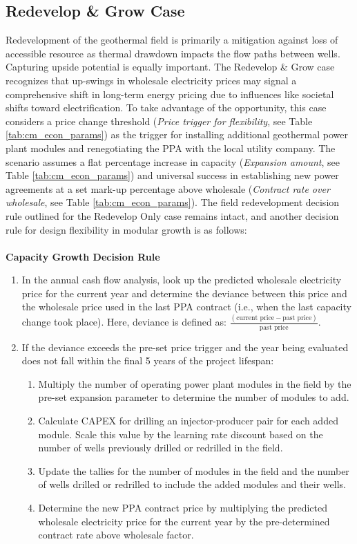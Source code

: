 \subsection{Redevelop \& Grow Case}\label{ch4:flex_grow_case}
Redevelopment of the geothermal field is primarily a mitigation against loss of accessible resource as thermal drawdown impacts the flow paths between wells. Capturing upside potential is equally important. The Redevelop \& Grow case recognizes that up-swings in wholesale electricity prices may signal a comprehensive shift in long-term energy pricing due to influences like societal shifts toward electrification. To take advantage of the opportunity, this case considers a price change threshold (\textit{Price trigger for flexibility}, see Table \ref{tab:cm_econ_params}) as the trigger for installing additional geothermal power plant modules and renegotiating the PPA with the local utility company. The scenario assumes a flat percentage increase in capacity (\textit{Expansion amount}, see Table \ref{tab:cm_econ_params}) and universal success in establishing new power agreements at a set mark-up percentage above wholesale (\textit{Contract rate over wholesale}, see Table \ref{tab:cm_econ_params}). The field redevelopment decision rule outlined for the Redevelop Only case remains intact, and another decision rule for design flexibility in modular growth is as follows:
\\
\\
\textbf{Capacity Growth Decision Rule}\label{ch4:dr_grow}
\begin{enumerate}
    \item In the annual cash flow analysis, look up the predicted wholesale electricity price for the current year and determine the deviance between this price and the wholesale price used in the last PPA contract (i.e., when the last capacity change took place). Here, deviance is defined as: \(\frac{(\text{current price} - \text{past price})}{\text{past price}}\).
    \item If the deviance exceeds the pre-set price trigger and the year being evaluated does not fall within the final 5 years of the project lifespan:
    \begin{enumerate}
        \item Multiply the number of operating power plant modules in the field by the pre-set expansion parameter to determine the number of modules to add.
        \item Calculate CAPEX for drilling an injector-producer pair for each added module. Scale this value by the learning rate discount based on the number of wells previously drilled or redrilled in the field.
        \item Update the tallies for the number of modules in the field and the number of wells drilled or redrilled to include the added modules and their wells.
        \item Determine the new PPA contract price by multiplying the predicted wholesale electricity price for the current year by the pre-determined contract rate above wholesale factor.
    \end{enumerate}
\end{enumerate}

